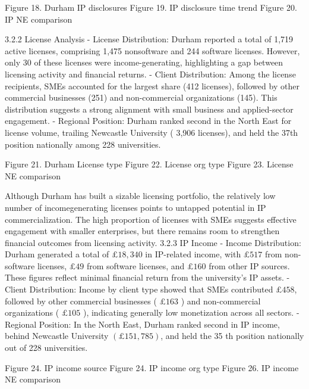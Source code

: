 Figure 18. Durham IP disclosures
Figure 19. IP disclosure time trend 
Figure 20. IP NE comparison

3.2.2 License Analysis
- License Distribution: Durham reported a total of 1,719 active licenses, comprising 1,475 nonsoftware and 244 software licenses. However, only 30 of these licenses were income-generating, highlighting a gap between licensing activity and financial returns.
- Client Distribution: Among the license recipients, SMEs accounted for the largest share (412 licenses), followed by other commercial businesses (251) and non-commercial organizations (145). This distribution suggests a strong alignment with small business and applied-sector engagement.
- Regional Position: Durham ranked second in the North East for license volume, trailing Newcastle University ( 3,906 licenses), and held the 37th position nationally among 228 universities.

Figure 21. Durham License type
Figure 22. License org type 
Figure 23. License NE comparison

Although Durham has built a sizable licensing portfolio, the relatively low number of incomegenerating licenses points to untapped potential in IP commercialization. The high proportion of licenses with SMEs suggests effective engagement with smaller enterprises, but there remains room to strengthen financial outcomes from licensing activity.
3.2.3 IP Income 
- Income Distribution: Durham generated a total of $£ 18,340$ in IP-related income, with $£ 517$ from non-software licenses, $£ 49$ from software licenses, and $£ 160$ from other IP sources. These figures reflect minimal financial return from the university's IP assets.
- Client Distribution: Income by client type showed that SMEs contributed $£ 458$, followed by other commercial businesses ( $£ 163$ ) and non-commercial organizations ( $£ 105$ ), indicating generally low monetization across all sectors.
- Regional Position: In the North East, Durham ranked second in IP income, behind Newcastle University $(£ 151,785)$, and held the 35 th position nationally out of 228 universities.

Figure 24. IP income source 
Figure 24. IP income org type
Figure 26. IP income NE comparison

